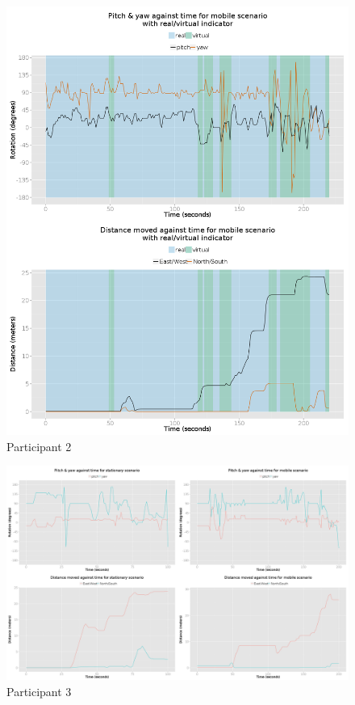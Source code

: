 \begin{figure}[h]
	\begin{center}
		\includegraphics[width=\linewidth]{images/25072014_1300_2up.png}
		\caption{Participant 2}
		\label{participant_2_2up}
	\end{center}
\end{figure}


	\begin{figure}[h]
		\begin{center}
			\includegraphics[width=\linewidth]{images/25072014_1400_4up.png}
			\caption{Participant 3}
			\label{participant_3_4up}
		\end{center}
	\end{figure}

